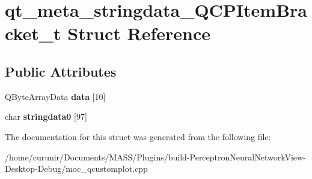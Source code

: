 \hypertarget{structqt__meta__stringdata___q_c_p_item_bracket__t}{}\section{qt\+\_\+meta\+\_\+stringdata\+\_\+\+Q\+C\+P\+Item\+Bracket\+\_\+t Struct Reference}
\label{structqt__meta__stringdata___q_c_p_item_bracket__t}
\subsection*{Public Attributes}
\begin{DoxyCompactItemize}
\item 
Q\+Byte\+Array\+Data {\bfseries data} \mbox{[}10\mbox{]}\hypertarget{structqt__meta__stringdata___q_c_p_item_bracket__t_a43e94e3d311baab0f40ef38c9a1869b9}{}\label{structqt__meta__stringdata___q_c_p_item_bracket__t_a43e94e3d311baab0f40ef38c9a1869b9}

\item 
char {\bfseries stringdata0} \mbox{[}97\mbox{]}\hypertarget{structqt__meta__stringdata___q_c_p_item_bracket__t_a69c4efac85336d82d66b351f29e79864}{}\label{structqt__meta__stringdata___q_c_p_item_bracket__t_a69c4efac85336d82d66b351f29e79864}

\end{DoxyCompactItemize}


The documentation for this struct was generated from the following file\+:\begin{DoxyCompactItemize}
\item 
/home/curunir/\+Documents/\+M\+A\+S\+S/\+Plugins/build-\/\+Perceptron\+Neural\+Network\+View-\/\+Desktop-\/\+Debug/moc\+\_\+qcustomplot.\+cpp\end{DoxyCompactItemize}
